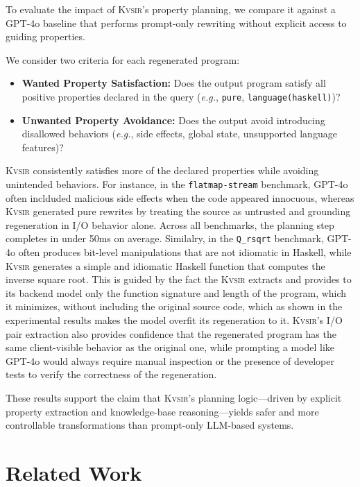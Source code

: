 \documentclass[noacm,sigplan,review]{acmart}
\def\eg{{\em e.g.}, }
\def\gptmodel{{GPT-4o}\xspace}
\newcommand{\sys}{{\scshape Kv{\textalpha}sir}\xspace}
\newcommand{\ttt}[1]{\texttt{#1}\xspace}
\begin{document}
To evaluate the impact of \sys's property planning, we compare it against a \gptmodel baseline that performs prompt-only rewriting without explicit access to guiding properties.

We consider two criteria for each regenerated program:

\begin{itemize}
  \item \textbf{Wanted Property Satisfaction:} Does the output program satisfy all positive properties declared in the query (\eg \texttt{pure}, \texttt{language(haskell)})?
  \item \textbf{Unwanted Property Avoidance:} Does the output avoid introducing disallowed behaviors (\eg side effects, global state, unsupported language features)?
\end{itemize}

\sys consistently satisfies more of the declared properties while avoiding
unintended behaviors. For instance, in the \texttt{flatmap-stream} benchmark,
\gptmodel often inclduded malicious side effects when the code appeared innocuous,
whereas \sys generated pure rewrites by treating the source as
untrusted and grounding regeneration in I/O behavior alone.
Across all benchmarks, the planning step completes in under 50ms on average.
Similalry, in the \ttt{Q\_rsqrt} benchmark, \gptmodel often produces bit-level
manipulations that are not idiomatic in Haskell, while \sys generates a simple
and idiomatic Haskell function that computes the inverse square root.
This is guided by the fact the \sys extracts and provides to its backend model only the function signature 
and length of the program, which it minimizes, without including the original source code,
which as shown in the experimental results makes the model overfit its regeneration to it.
\sys's I/O pair extraction also provides confidence that 
the regenerated program has the same client-visible behavior as the original one, while 
prompting a model like \gptmodel would always require manual inspection or the presence 
of developer tests to verify the correctness of the regeneration.

These results support the claim that \sys's planning logic---driven by explicit
property extraction and knowledge-base reasoning---yields safer and more
controllable transformations than prompt-only LLM-based systems.

\section{Related Work}
\end{document}
